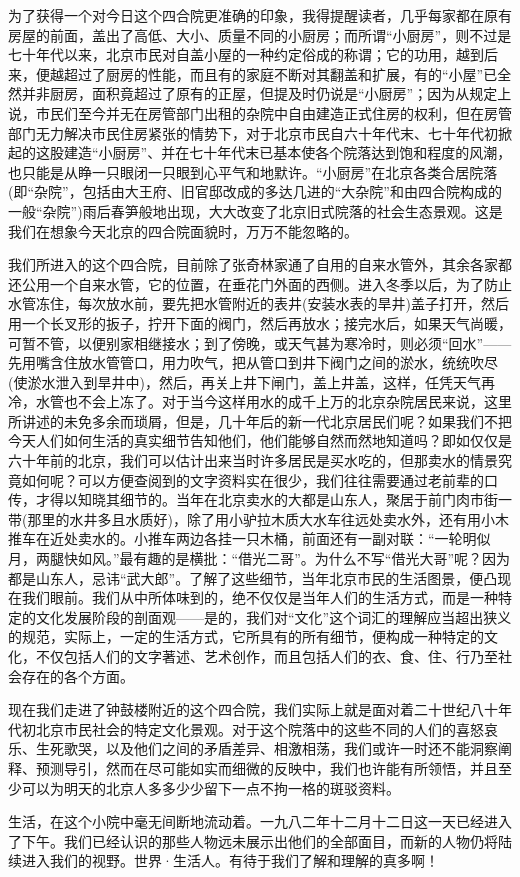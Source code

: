\par 为了获得一个对今日这个四合院更准确的印象，我得提醒读者，几乎每家都在原有房屋的前面，盖出了高低、大小、质量不同的小厨房；而所谓“小厨房”，则不过是七十年代以来，北京市民对自盖小屋的一种约定俗成的称谓；它的功用，越到后来，便越超过了厨房的性能，而且有的家庭不断对其翻盖和扩展，有的“小屋”已全然并非厨房，面积竟超过了原有的正屋，但提及时仍说是“小厨房”；因为从规定上说，市民们至今并无在房管部门出租的杂院中自由建造正式住房的权利，但在房管部门无力解决市民住房紧张的情势下，对于北京市民自六十年代末、七十年代初掀起的这股建造“小厨房”、并在七十年代末已基本使各个院落达到饱和程度的风潮，也只能是从睁一只眼闭一只眼到心平气和地默许。“小厨房”在北京各类合居院落(即“杂院”，包括由大王府、旧官邸改成的多达几进的“大杂院”和由四合院构成的一般“杂院”)雨后春笋般地出现，大大改变了北京旧式院落的社会生态景观。这是我们在想象今天北京的四合院面貌时，万万不能忽略的。
\par 我们所进入的这个四合院，目前除了张奇林家通了自用的自来水管外，其余各家都还公用一个自来水管，它的位置，在垂花门外面的西侧。进入冬季以后，为了防止水管冻住，每次放水前，要先把水管附近的表井(安装水表的旱井)盖子打开，然后用一个长叉形的扳子，拧开下面的阀门，然后再放水；接完水后，如果天气尚暖，可暂不管，以便别家相继接水；到了傍晚，或天气甚为寒冷时，则必须“回水”——先用嘴含住放水管管口，用力吹气，把从管口到井下阀门之间的淤水，统统吹尽(使淤水泄入到旱井中)，然后，再关上井下闸门，盖上井盖，这样，任凭天气再冷，水管也不会上冻了。对于当今这样用水的成千上万的北京杂院居民来说，这里所讲述的未免多余而琐屑，但是，几十年后的新一代北京居民们呢？如果我们不把今天人们如何生活的真实细节告知他们，他们能够自然而然地知道吗？即如仅仅是六十年前的北京，我们可以估计出来当时许多居民是买水吃的，但那卖水的情景究竟如何呢？可以方便查阅到的文字资料实在很少，我们往往需要通过老前辈的口传，才得以知晓其细节的。当年在北京卖水的大都是山东人，聚居于前门肉市街一带(那里的水井多且水质好)，除了用小驴拉木质大水车往远处卖水外，还有用小木推车在近处卖水的。小推车两边各挂一只木桶，前面还有一副对联：“一轮明似月，两腿快如风。”最有趣的是横批：“借光二哥”。为什么不写“借光大哥”呢？因为都是山东人，忌讳“武大郎”。了解了这些细节，当年北京市民的生活图景，便凸现在我们眼前。我们从中所体味到的，绝不仅仅是当年人们的生活方式，而是一种特定的文化发展阶段的剖面观——是的，我们对“文化”这个词汇的理解应当超出狭义的规范，实际上，一定的生活方式，它所具有的所有细节，便构成一种特定的文化，不仅包括人们的文字著述、艺术创作，而且包括人们的衣、食、住、行乃至社会存在的各个方面。
\par 现在我们走进了钟鼓楼附近的这个四合院，我们实际上就是面对着二十世纪八十年代初北京市民社会的特定文化景观。对于这个院落中的这些不同的人们的喜怒哀乐、生死歌哭，以及他们之间的矛盾差异、相激相荡，我们或许一时还不能洞察阐释、预测导引，然而在尽可能如实而细微的反映中，我们也许能有所领悟，并且至少可以为明天的北京人多多少少留下一点不拘一格的斑驳资料。
\par 生活，在这个小院中毫无间断地流动着。一九八二年十二月十二日这一天已经进入了下午。我们已经认识的那些人物远未展示出他们的全部面目，而新的人物仍将陆续进入我们的视野。世界·生活人。有待于我们了解和理解的真多啊！


